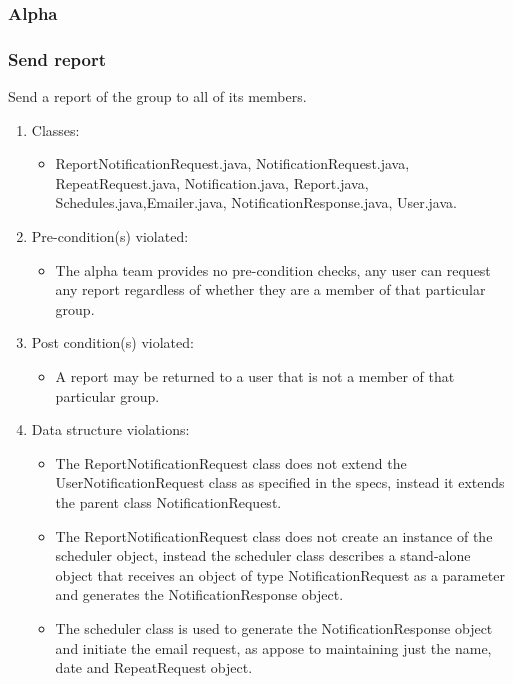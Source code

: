 \subsubsection{Alpha}
\subsubsection*{Send report}
Send a report of the group to all of its members.
\begin{enumerate}
	\item Classes: 
		\begin{itemize}
			\item ReportNotificationRequest.java, NotificationRequest.java, RepeatRequest.java, Notification.java, Report.java, 					Schedules.java,Emailer.java, NotificationResponse.java, User.java.
		\end{itemize}
	\item Pre-condition(s) violated:
		\begin{itemize}
			\item The alpha team provides no pre-condition checks, any user can request any report regardless of whether they are 				a member of that particular group.
		\end{itemize}
	\item Post condition(s) violated: 
		\begin{itemize}
			\item A report may be returned to a user that is not a member of that particular group.
		\end{itemize}
	\item Data structure violations:
		\begin{itemize}
			\item The ReportNotificationRequest class does not extend the UserNotificationRequest class as specified in the 						specs, instead it extends the parent class NotificationRequest.
			\item The ReportNotificationRequest class does not create an instance of the scheduler object, instead the scheduler 					class describes a stand-alone object that receives an object of type NotificationRequest as a parameter and 						generates the NotificationResponse object.
			\item The scheduler class is used to generate the NotificationResponse object and initiate the email request, as 						appose to maintaining just the name, date and RepeatRequest object. 
		\end{itemize}
\end{enumerate}
\newpage

